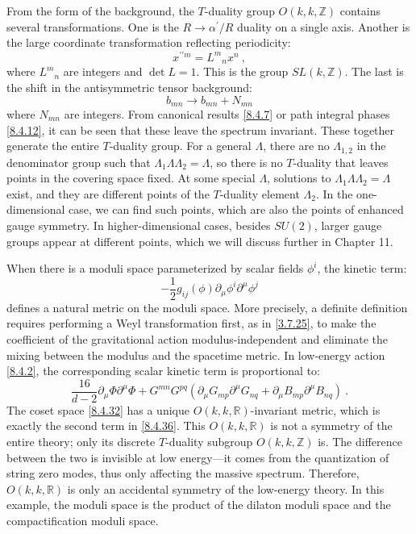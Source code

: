 From the form of the background, the $T$-duality group $O(k, k, \mathds{Z})$ contains several transformations. 
One is the $R \rightarrow \alpha^{\prime} / R$ duality on a single axis. 
Another is the large coordinate transformation reflecting periodicity:
\begin{equation}
	x^{\prime \prime m}=L^{m}{}_{n} x^{n} \:, \label{8.4.33}
\end{equation}
where $L^{m}{}_{n}$ are integers and $\operatorname{det}L=1$. This is the group $SL(k, \mathds{Z})$. 
The last is the shift in the antisymmetric tensor background:
\begin{equation}
	b_{m n} \rightarrow b_{m n}+N_{m n} \label{8.4.34}
\end{equation}
where $N_{m n}$ are integers. From canonical results \eqref{8.4.7} or path integral phases \eqref{8.4.12}, it can be seen that these leave the spectrum invariant. These together generate the entire $T$-duality group. 
For a general $\Lambda$, there are no $\Lambda_{1,2}$ in the denominator group such that $\Lambda_{1} \Lambda \Lambda_{2}=\Lambda$, so there is no $T$-duality that leaves points in the covering space fixed. 
At some special $\Lambda$, solutions to $\Lambda_{1} \Lambda \Lambda_{2}=\Lambda$ exist, and they are different points of the $T$-duality element $\Lambda_{2}$. 
In the one-dimensional case, we can find such points, which are also the points of enhanced gauge symmetry. In higher-dimensional cases, besides $SU(2)$, larger gauge groups appear at different points, which we will discuss further in Chapter 11.

When there is a moduli space parameterized by scalar fields $\phi^{i}$, the kinetic term:
\begin{equation}
	-\frac{1}{2} g_{i j}(\phi) \partial_{\mu} \phi^{i} \partial^{\mu} \phi^{j} \label{8.4.35}
\end{equation}
defines a natural metric on the moduli space. 
More precisely, a definite definition requires performing a Weyl transformation first, as in \eqref{3.7.25}, to make the coefficient of the gravitational action modulus-independent and eliminate the mixing between the modulus and the spacetime metric. 
In low-energy action \eqref{8.4.2}, the corresponding scalar kinetic term is proportional to:
\begin{equation}
	\frac{16}{d-2} \partial_{\mu} \Phi \partial^{\mu} \Phi+G^{m n} G^{p q}
	(\partial_{\mu} G_{m p} \partial^{\mu} G_{n q}+\partial_{\mu} B_{m p} \partial^{\mu} B_{n q}) \:. \label{8.4.36}
\end{equation}
The coset space \eqref{8.4.32} has a unique $O(k, k, \mathds{R})$-invariant metric, which is exactly the second term in \eqref{8.4.36}. 
This $O(k, k, \mathds{R})$ is not a symmetry of the entire theory; only its discrete $T$-duality subgroup $O(k, k, \mathds{Z})$ is. 
The difference between the two is invisible at low energy—it comes from the quantization of string zero modes, thus only affecting the massive spectrum. Therefore, $O(k, k, \mathds{R})$ is only an accidental symmetry of the low-energy theory. 
In this example, the moduli space is the product of the dilaton moduli space and the compactification moduli space.

